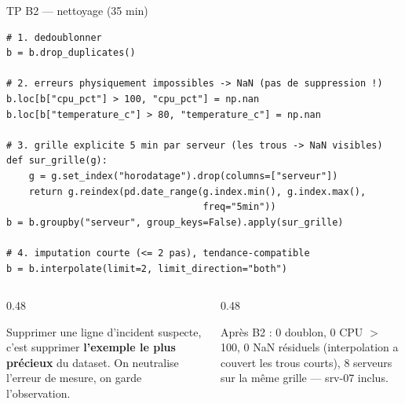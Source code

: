 \begin{frame}[fragile]{TP B2 --- nettoyage (35 min)}
\footnotesize%
\begin{codebox}
\begin{lstlisting}
# 1. dedoublonner
b = b.drop_duplicates()

# 2. erreurs physiquement impossibles -> NaN (pas de suppression !)
b.loc[b["cpu_pct"] > 100, "cpu_pct"] = np.nan
b.loc[b["temperature_c"] > 80, "temperature_c"] = np.nan

# 3. grille explicite 5 min par serveur (les trous -> NaN visibles)
def sur_grille(g):
    g = g.set_index("horodatage").drop(columns=["serveur"])
    return g.reindex(pd.date_range(g.index.min(), g.index.max(),
                                   freq="5min"))
b = b.groupby("serveur", group_keys=False).apply(sur_grille)

# 4. imputation courte (<= 2 pas), tendance-compatible
b = b.interpolate(limit=2, limit_direction="both")
\end{lstlisting}
\end{codebox}
\begin{columns}[t]
\begin{column}{0.48\textwidth}
\begin{wbox}
Supprimer une ligne d'incident suspecte, c'est supprimer
\textbf{l'exemple le plus précieux} du dataset. On neutralise
l'erreur de mesure, on garde l'observation.
\end{wbox}
\end{column}
\begin{column}{0.48\textwidth}
\begin{ebox}
Après B2 : 0 doublon, 0 CPU $>$ 100, 0 NaN résiduels
(interpolation a couvert les trous courts), 8 serveurs
sur la même grille --- srv-07 inclus.
\end{ebox}
\end{column}
\end{columns}
\end{frame}

